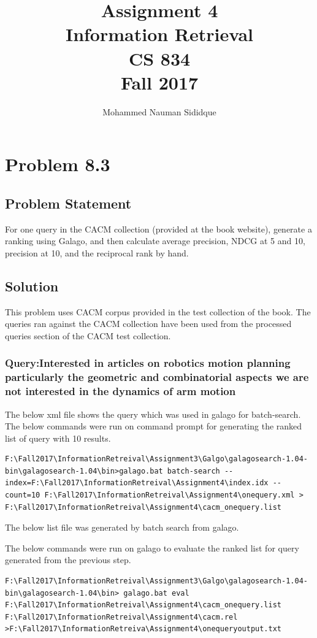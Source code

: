 \documentclass[12pt]{report}
\author{Mohammed Nauman Sididque}
\title{Assignment 4 \\Information Retrieval \\ CS 834 \\ Fall 2017 }
\begin{document}
\maketitle
\tableofcontents
\chapter{Problem 8.3}
\section{Problem Statement}
For one query in the CACM collection (provided at the book website), generate a ranking using Galago, and then calculate average precision, NDCG at 5 and 10, precision at 10, and the reciprocal rank by hand.
\section{Solution}
This problem uses CACM corpus provided in the test collection of the book. The queries ran against the CACM collection have been used from the processed queries section of the CACM test collection.\\

\subsection{Query:Interested in articles on robotics motion planning particularly the geometric and combinatorial aspects we are not interested in the dynamics of arm motion}

The below xml file shows the query which was used in galago for batch-search.\\


The below commands were run on command prompt for generating the ranked list of query with 10 results. 
\begin{lstlisting}[style=DOS]
F:\Fall2017\InformationRetreival\Assignment3\Galgo\galagosearch-1.04-bin\galagosearch-1.04\bin>galago.bat batch-search --index=F:\Fall2017\InformationRetreival\Assignment4\index.idx --count=10 F:\Fall2017\InformationRetreival\Assignment4\onequery.xml > F:\Fall2017\InformationRetreival\Assignment4\cacm_onequery.list
\end{lstlisting}

The below list file was generated by batch search from galago.


The below commands were run on galago to evaluate the ranked list for query generated from the previous step.
\begin{lstlisting}[style=DOS]
F:\Fall2017\InformationRetreival\Assignment3\Galgo\galagosearch-1.04-bin\galagosearch-1.04\bin> galago.bat eval F:\Fall2017\InformationRetreival\Assignment4\cacm_onequery.list  F:\Fall2017\InformationRetreival\Assignment4\cacm.rel >F:\Fall2017\InformationRetreiva\Assignment4\onequeryoutput.txt
\end{lstlisting}
\end{document}
